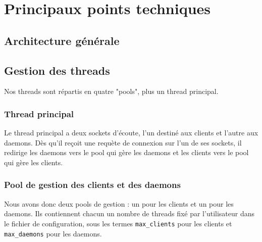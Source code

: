 \section{Principaux points techniques}


\subsection{Architecture générale}




\subsection{Gestion des threads}
Nos threads sont répartis en quatre "pools", plus un thread principal.

\subsubsection{Thread principal}
Le thread principal a deux sockets d'écoute, l'un destiné aux clients et
l'autre aux daemons. Dès qu'il reçoit une requète de connexion sur l'un de
ses sockets, il redirige les daemons vers le pool qui gère les daemons et
les clients vers le pool qui gère les clients.

\subsubsection{Pool de gestion des clients et des daemons}
Nous avons donc deux pools de gestion : un pour les clients et un pour
les daemons. Ils contiennent chacun un nombre de threads fixé par
l'utilisateur dans le fichier de configuration, sous les termes 
\verb$max_clients$ pour les clients et \verb$max_daemons$ pour les
daemons.

